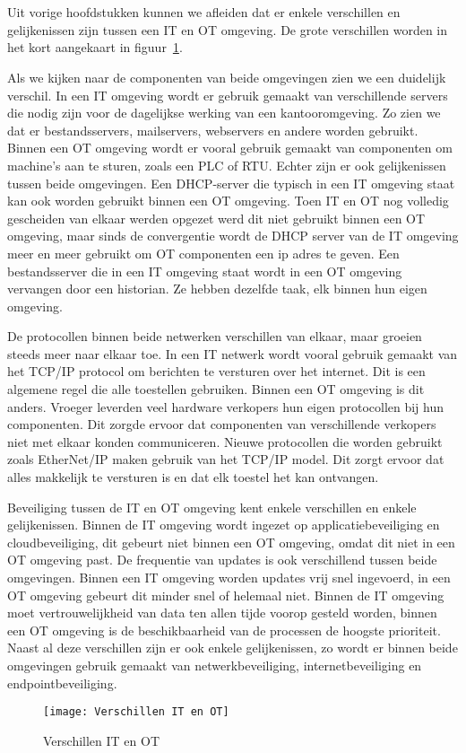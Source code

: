\section{}
\label{sec:Vergelijking IT en OT}
Uit vorige hoofdstukken kunnen we afleiden dat er enkele verschillen en gelijkenissen zijn tussen een IT en OT omgeving. De grote verschillen worden in het kort aangekaart in figuur~\ref{fig:2.11}.

Als we kijken naar de componenten van beide omgevingen zien we een duidelijk verschil. In een IT omgeving wordt er gebruik gemaakt van verschillende servers die nodig zijn voor de dagelijkse werking van een kantooromgeving. Zo zien we dat er bestandsservers, mailservers, webservers en andere worden gebruikt. Binnen een OT omgeving wordt er vooral gebruik gemaakt van componenten om machine's aan te sturen, zoals een PLC of RTU. Echter zijn er ook gelijkenissen tussen beide omgevingen. Een DHCP-server die typisch in een IT omgeving staat kan ook worden gebruikt binnen een OT omgeving. Toen IT en OT nog volledig gescheiden van elkaar werden opgezet werd dit niet gebruikt binnen een OT omgeving, maar sinds de convergentie wordt de DHCP server van de IT omgeving meer en meer gebruikt om OT componenten een ip adres te geven. Een bestandsserver die in een IT omgeving staat wordt in een OT omgeving vervangen door een historian. Ze hebben dezelfde taak, elk binnen hun eigen omgeving. 

De protocollen binnen beide netwerken verschillen van elkaar, maar groeien steeds meer naar elkaar toe. In een IT netwerk wordt vooral gebruik gemaakt van het TCP/IP protocol om berichten te versturen over het internet. Dit is een algemene regel die alle toestellen gebruiken. Binnen een OT omgeving is dit anders. Vroeger leverden veel hardware verkopers hun eigen protocollen bij hun componenten. Dit zorgde ervoor dat componenten van verschillende verkopers niet met elkaar konden communiceren. Nieuwe protocollen die worden gebruikt zoals EtherNet/IP maken gebruik van het TCP/IP model. Dit zorgt ervoor dat alles makkelijk te versturen is en dat elk toestel het kan ontvangen.

Beveiliging tussen de IT en OT omgeving kent enkele verschillen en enkele gelijkenissen. Binnen de IT omgeving wordt ingezet op applicatiebeveiliging en cloudbeveiliging, dit gebeurt niet binnen een OT omgeving, omdat dit niet in een OT omgeving past. De frequentie van updates is ook verschillend tussen beide omgevingen. Binnen een IT omgeving worden updates vrij snel ingevoerd, in een OT omgeving gebeurt dit minder snel of helemaal niet. Binnen de IT omgeving moet vertrouwelijkheid van data ten allen tijde voorop gesteld worden, binnen een OT omgeving is de beschikbaarheid van de processen de hoogste prioriteit. Naast al deze verschillen zijn er ook enkele gelijkenissen, zo wordt er binnen beide omgevingen gebruik gemaakt van netwerkbeveiliging, internetbeveiliging en endpointbeveiliging. 
\begin{figure}
    \texttt{[image: Verschillen IT en OT]}
    \caption{Verschillen IT en OT \label{fig:2.11}} 
\end{figure}

